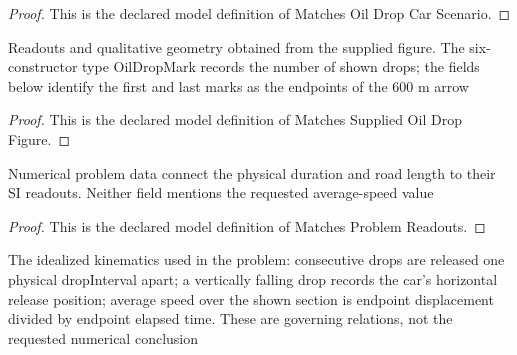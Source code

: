 \begin{proof}
  This is the declared model definition of Matches Oil Drop Car Scenario.
\end{proof}
\begin{definition}
  \label{def:physics:phyx-mini-0668:phyxminiproblems-problemphyxmini0668-matchessuppliedoildropfigure}
  Readouts and qualitative geometry obtained from the supplied figure. The six-constructor type OilDropMark records the number of shown drops; the fields below identify the first and last marks as the endpoints of the 600 m arrow
\end{definition}
\begin{proof}
  This is the declared model definition of Matches Supplied Oil Drop Figure.
\end{proof}
\begin{definition}
  \label{def:physics:phyx-mini-0668:phyxminiproblems-problemphyxmini0668-matchesproblemreadouts}
  Numerical problem data connect the physical duration and road length to their SI readouts. Neither field mentions the requested average-speed value
\end{definition}
\begin{proof}
  This is the declared model definition of Matches Problem Readouts.
\end{proof}
\begin{definition}
  \label{def:physics:phyx-mini-0668:phyxminiproblems-problemphyxmini0668-satisfiesoildropkinematics}
  The idealized kinematics used in the problem: consecutive drops are released one physical dropInterval apart; a vertically falling drop records the car's horizontal release position; average speed over the shown section is endpoint displacement divided by endpoint elapsed time. These are governing relations, not the requested numerical conclusion
\end{definition}
